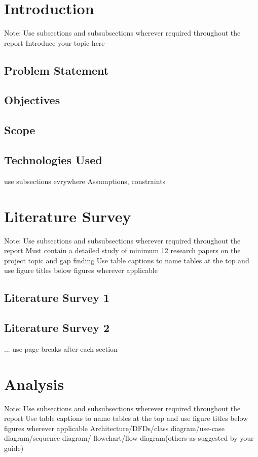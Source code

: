 \documentclass[12pt,singleside,a4paper]{article}
\begin{document}
\section{Introduction}
Note: Use subsections and subsubsections wherever required throughout the report
\newline Introduce your topic here
\subsection{Problem Statement}
\subsection{Objectives}
\subsection{Scope}
\subsection{Technologies Used}
\newline 
use subsections evrywhere Assumptions, constraints
\section{Literature Survey}
Note: Use subsections and subsubsections wherever required throughout the report
\newline Must contain a detailed study of minimum 12 research papers on the project topic and gap finding
\newline Use table captions to name tables at the top and use figure titles below figures wherever applicable 
\subsection{Literature Survey 1}
\subsection{Literature Survey 2}
...
\newline use page breaks after each section


\section{Analysis}
 Note: Use subsections and subsubsections wherever required throughout the report
\newline Use table captions to name tables at the top and use figure titles below figures wherever applicable 
Architecture/DFDs/class diagram/use-case diagram/sequence diagram/ flowchart/flow-diagram(others-as suggested by your guide)
\end{document}
